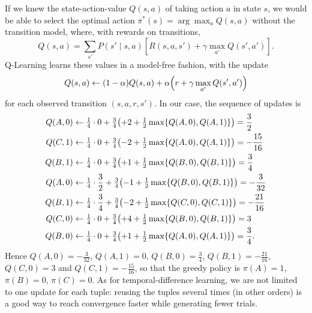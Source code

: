 \documentclass[11pt, a4paper]{exam}
\begin{document}
\begin{exercises}
\begin{parts}
\begin{solution}
        If we knew the state-action-value $Q(s, a)$ of taking action $a$ in state $s$, we would be able to select the optimal action $\pi^*(s) = \arg \max_a Q(s, a)$ without the transition model, where, with rewards on transitions,
        \begin{equation*}
            Q(s, a) = \sum_{s'} P(s' \mid s, a) \left[ R(s, a, s') + \gamma \max_{a'} Q(s', a') \right].
        \end{equation*}
        Q-Learning learns these values in a model-free fashion, with the update
        \begin{equation*}
            Q(s, a) \leftarrow (1 - \alpha) Q(s, a) + \alpha \rbk*{r + \gamma \max_{a'} Q(s', a')}
        \end{equation*}
        for each observed transition $(s, a, r, s')$. In our case, the sequence of updates is
        \begin{align*}
            Q(A, 0) & \leftarrow \tfrac{1}{4} \cdot 0 + \tfrac{3}{4} \rbk*{+2 + \tfrac{1}{2} \max \cbk{Q(A, 0), Q(A, 1)}} = \frac{3}{2} \\
            Q(C, 1) & \leftarrow \tfrac{1}{4} \cdot 0 + \tfrac{3}{4} \rbk*{-2 + \tfrac{1}{2} \max \cbk{Q(A, 0), Q(A, 1)}} = -\frac{15}{16} \\
            Q(B, 1) & \leftarrow \tfrac{1}{4} \cdot 0 + \tfrac{3}{4} \rbk*{+1 + \tfrac{1}{2} \max \cbk{Q(B, 0), Q(B, 1)}} = \frac{3}{4} \\
            Q(A, 0) & \leftarrow \tfrac{1}{4} \cdot \frac{3}{2} + \tfrac{3}{4} \rbk*{-1 + \tfrac{1}{2} \max \cbk{Q(B, 0), Q(B, 1)}} = -\frac{3}{32} \\
            Q(B, 1) & \leftarrow \tfrac{1}{4} \cdot \frac{3}{4} + \tfrac{3}{4} \rbk*{-2 + \tfrac{1}{2} \max \cbk{Q(C, 0), Q(C, 1)}} = -\frac{21}{16} \\
            Q(C, 0) & \leftarrow \tfrac{1}{4} \cdot 0 + \tfrac{3}{4} \rbk*{+4 + \tfrac{1}{2} \max \cbk{Q(B, 0), Q(B, 1)}} = 3 \\
            Q(B, 0) & \leftarrow \tfrac{1}{4} \cdot 0 + \tfrac{3}{4} \rbk*{+1 + \tfrac{1}{2} \max \cbk{Q(A, 0), Q(A, 1)}} = \frac{3}{4}.
        \end{align*}
        Hence $Q(A, 0) = -\frac{3}{32}$, $Q(A, 1) = 0$, $Q(B, 0) = \frac{3}{4}$, $Q(B, 1) = -\frac{21}{16}$, $Q(C, 0) = 3$ and $Q(C, 1) = -\frac{15}{16}$, so that the greedy policy is $\pi(A) = 1$, $\pi(B) = 0$, $\pi(C) = 0$. As for temporal-difference learning, we are not limited to one update for each tuple: reusing the tuples several times (in other orders) is a good way to reach convergence faster while generating fewer trials.
    \end{solution}


\end{parts}
\end{exercises}
\end{document}
